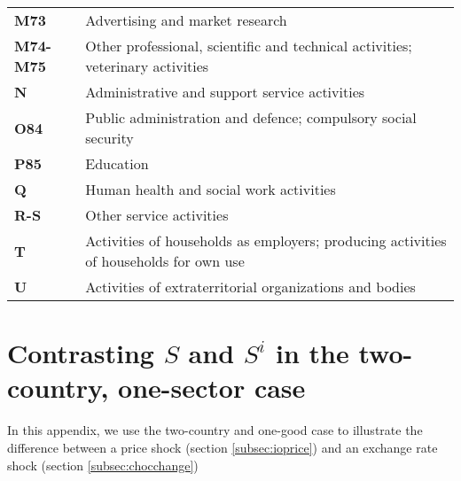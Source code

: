 \documentclass[11pt,a4paper]{article}
\begin{document}
\begin{table}[!h]
\begin{tabular}{ll}
\textbf{M73} &{Advertising and market research}\\
\textbf{M74-M75} &{Other professional, scientific and technical activities; veterinary activities}\\
\textbf{N} &{Administrative and support service activities}\\
\textbf{O84} &{Public administration and defence; compulsory social security}\\
\textbf{P85} &{Education}\\
\textbf{Q} &{Human health and social work activities}\\
\textbf{R-S} &{Other service activities}\\
\textbf{T} &{Activities of households as employers; producing activities of households for own use}\\
\textbf{U} &{Activities of extraterritorial organizations and bodies}\\
  	\end{tabular}
\label{tab:wiodindustries}
\end{table}

\newpage
\section{Contrasting $S$ and $S^i$ in the two-country, one-sector case}
In this appendix, we use the two-country and one-good case to illustrate the difference between a price shock (section \ref{subsec:ioprice}) and an exchange rate shock (section \ref{subsec:chocchange})
\end{document}
